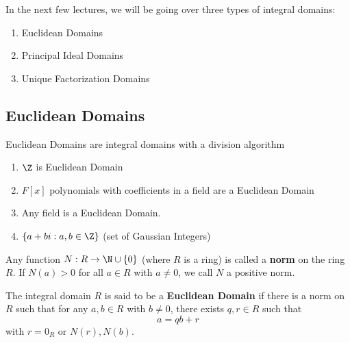 
In the next few lectures, we will be going over three types of integral domains:

\begin{enumerate}
    \item[(1)] Euclidean Domains
    \item[(2)] Principal Ideal Domains
    \item[(3)] Unique Factorization Domains 
\end{enumerate}

\subsection{Euclidean Domains}

Euclidean Domains are integral domains with a division algorithm

\begin{eg}
   \begin{enumerate}
        \item[(i)] \( \Z \) is Euclidean Domain
       \item[(ii)] \( F[x] \) polynomials with coefficients in a field are a Euclidean Domain 
        \item[(iii)] Any field is a Euclidean Domain.
        \item[(iv)] \( \{ a + b i : a,b \in \Z  \}  \) (set of Gaussian Integers)
   \end{enumerate} 
\end{eg}

\begin{definition}
    Any function \( N: R \to \N \cup \{ 0  \}  \) (where \( R  \) is a ring) is called a \textbf{norm} on the ring \( R \). If \( N(a) > 0  \) for all \( a \in R  \) with \( a \neq 0  \), we call \( N \) a positive norm.
\end{definition}

\begin{definition}
    The integral domain \( R  \) is said to be a \textbf{Euclidean Domain} if there is a norm on \( R  \) such that for any \( a,b \in R  \) with \( b \neq 0 \), there exists \( q,r \in R  \) such that 
    \[  a = qb + r  \]
    with \( r = {0}_{R}  \) or \( N(r) , N(b) \).
\end{definition}

